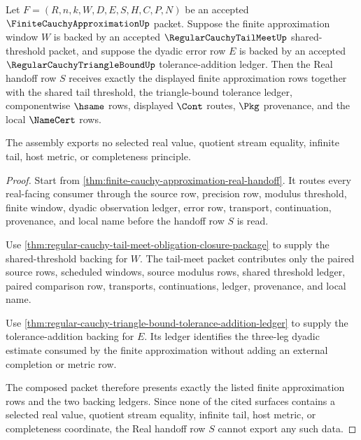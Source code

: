 \begin{theorem}
\label{thm:finite-cauchy-approximation-tail-meet-triangle-assembly}
Let $F=(R,n,k,W,D,E,S,H,C,P,N)$ be an accepted $\FiniteCauchyApproximationUp$ packet. Suppose the finite approximation window $W$ is backed by an accepted $\RegularCauchyTailMeetUp$ shared-threshold packet, and suppose the dyadic error row $E$ is backed by an accepted $\RegularCauchyTriangleBoundUp$ tolerance-addition ledger. Then the Real handoff row $S$ receives exactly the displayed finite approximation rows together with the shared tail threshold, the triangle-bound tolerance ledger, componentwise $\hsame$ rows, displayed $\Cont$ routes, $\Pkg$ provenance, and the local $\NameCert$ rows.

The assembly exports no selected real value, quotient stream equality, infinite tail, host metric, or completeness principle.
\end{theorem}
\begin{proof}
Start from \autoref{thm:finite-cauchy-approximation-real-handoff}. It routes every real-facing consumer through the source row, precision row, modulus threshold, finite window, dyadic observation ledger, error row, transport, continuation, provenance, and local name before the handoff row $S$ is read.

Use \autoref{thm:regular-cauchy-tail-meet-obligation-closure-package} to supply the shared-threshold backing for $W$. The tail-meet packet contributes only the paired source rows, scheduled windows, source modulus rows, shared threshold ledger, paired comparison row, transports, continuations, ledger, provenance, and local name.

Use \autoref{thm:regular-cauchy-triangle-bound-tolerance-addition-ledger} to supply the tolerance-addition backing for $E$. Its ledger identifies the three-leg dyadic estimate consumed by the finite approximation without adding an external completion or metric row.

The composed packet therefore presents exactly the listed finite approximation rows and the two backing ledgers. Since none of the cited surfaces contains a selected real value, quotient stream equality, infinite tail, host metric, or completeness coordinate, the Real handoff row $S$ cannot export any such data.
\end{proof}

